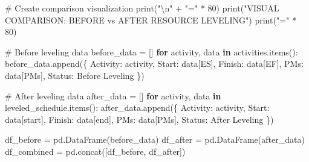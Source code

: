 \documentclass[
  letterpaper,
  DIV=11,
  numbers=noendperiod]{scrreprt}
\newenvironment{Shaded}{\begin{snugshade}}{\end{snugshade}}
\newcommand{\BuiltInTok}[1]{\textcolor[rgb]{0.00,0.23,0.31}{#1}}
\newcommand{\CharTok}[1]{\textcolor[rgb]{0.13,0.47,0.30}{#1}}
\newcommand{\CommentTok}[1]{\textcolor[rgb]{0.37,0.37,0.37}{#1}}
\newcommand{\ControlFlowTok}[1]{\textcolor[rgb]{0.00,0.23,0.31}{\textbf{#1}}}
\newcommand{\DecValTok}[1]{\textcolor[rgb]{0.68,0.00,0.00}{#1}}
\newcommand{\KeywordTok}[1]{\textcolor[rgb]{0.00,0.23,0.31}{\textbf{#1}}}
\newcommand{\NormalTok}[1]{\textcolor[rgb]{0.00,0.23,0.31}{#1}}
\newcommand{\OperatorTok}[1]{\textcolor[rgb]{0.37,0.37,0.37}{#1}}
\newcommand{\StringTok}[1]{\textcolor[rgb]{0.13,0.47,0.30}{#1}}
\begin{document}
\begin{Shaded}
\begin{Highlighting}[]
    \CommentTok{\# Create comparison visualization}
    \BuiltInTok{print}\NormalTok{(}\StringTok{"}\CharTok{\textbackslash{}n}\StringTok{"} \OperatorTok{+} \StringTok{"="} \OperatorTok{*} \DecValTok{80}\NormalTok{)}
    \BuiltInTok{print}\NormalTok{(}\StringTok{"VISUAL COMPARISON: BEFORE vs AFTER RESOURCE LEVELING"}\NormalTok{)}
    \BuiltInTok{print}\NormalTok{(}\StringTok{"="} \OperatorTok{*} \DecValTok{80}\NormalTok{)}
    
    \CommentTok{\# Before leveling data}
\NormalTok{    before\_data }\OperatorTok{=}\NormalTok{ []}
    \ControlFlowTok{for}\NormalTok{ activity, data }\KeywordTok{in}\NormalTok{ activities.items():}
\NormalTok{        before\_data.append(\{}
            \StringTok{\textquotesingle{}Activity\textquotesingle{}}\NormalTok{: activity,}
            \StringTok{\textquotesingle{}Start\textquotesingle{}}\NormalTok{: data[}\StringTok{\textquotesingle{}ES\textquotesingle{}}\NormalTok{],}
            \StringTok{\textquotesingle{}Finish\textquotesingle{}}\NormalTok{: data[}\StringTok{\textquotesingle{}EF\textquotesingle{}}\NormalTok{],}
            \StringTok{\textquotesingle{}PMs\textquotesingle{}}\NormalTok{: data[}\StringTok{\textquotesingle{}PMs\textquotesingle{}}\NormalTok{],}
            \StringTok{\textquotesingle{}Status\textquotesingle{}}\NormalTok{: }\StringTok{\textquotesingle{}Before Leveling\textquotesingle{}}
\NormalTok{        \})}
    
    \CommentTok{\# After leveling data}
\NormalTok{    after\_data }\OperatorTok{=}\NormalTok{ []}
    \ControlFlowTok{for}\NormalTok{ activity, data }\KeywordTok{in}\NormalTok{ leveled\_schedule.items():}
\NormalTok{        after\_data.append(\{}
            \StringTok{\textquotesingle{}Activity\textquotesingle{}}\NormalTok{: activity,}
            \StringTok{\textquotesingle{}Start\textquotesingle{}}\NormalTok{: data[}\StringTok{\textquotesingle{}start\textquotesingle{}}\NormalTok{],}
            \StringTok{\textquotesingle{}Finish\textquotesingle{}}\NormalTok{: data[}\StringTok{\textquotesingle{}end\textquotesingle{}}\NormalTok{],}
            \StringTok{\textquotesingle{}PMs\textquotesingle{}}\NormalTok{: data[}\StringTok{\textquotesingle{}PMs\textquotesingle{}}\NormalTok{],}
            \StringTok{\textquotesingle{}Status\textquotesingle{}}\NormalTok{: }\StringTok{\textquotesingle{}After Leveling\textquotesingle{}}
\NormalTok{        \})}
    
\NormalTok{    df\_before }\OperatorTok{=}\NormalTok{ pd.DataFrame(before\_data)}
\NormalTok{    df\_after }\OperatorTok{=}\NormalTok{ pd.DataFrame(after\_data)}
\NormalTok{    df\_combined }\OperatorTok{=}\NormalTok{ pd.concat([df\_before, df\_after])}
    

\end{Highlighting}
\end{Shaded}
\end{document}
